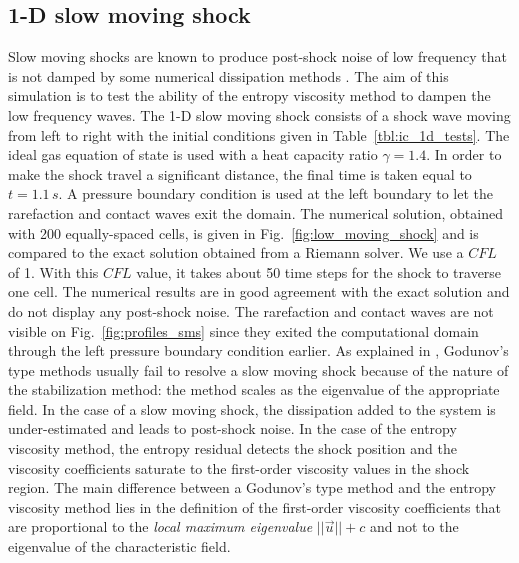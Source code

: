 \documentclass[review,10pt]{elsarticle}
\newcommand{\fig}[1]{Fig.~\ref{#1}}                      %
\newcommand{\tbl}[1]{Table~\ref{#1}}                     %
\begin{document}
\subsection{1-D slow moving shock} \label{sec:slow_moving_shock}

Slow moving shocks are known to produce post-shock noise of low frequency that is not damped by some 
numerical dissipation methods \cite{james}. The aim of this simulation is to test the ability of the 
entropy viscosity method to dampen the low frequency waves.
The 1-D slow moving shock consists of a shock wave moving from left to right with the initial conditions 
given in \tbl{tbl:ic_1d_tests}. The ideal gas equation of state is used with a heat capacity ratio 
$\gamma=1.4$.  In order to make the shock travel a significant distance, the final time is taken 
equal to $t=1.1\,s$. A pressure boundary condition is used at the left boundary to let the rarefaction 
and contact waves exit the domain.   
%
The numerical solution, obtained with 200 equally-spaced cells, is given in \fig{fig:low_moving_shock} 
and is compared to the exact solution obtained from a Riemann solver. We use a $CFL$ of 1. With this 
$CFL$ value, it takes about 50 time steps for the shock to traverse one cell.
%
The numerical results are in good agreement with the exact solution and do not display any post-shock 
noise. The rarefaction and contact waves are not visible on \fig{fig:profiles_sms} since they exited 
the computational domain through the left pressure boundary condition earlier. As explained in 
\cite{roberts}, Godunov's type methods usually fail to resolve a slow moving shock because of the 
nature of the stabilization method: the method scales as the eigenvalue of the appropriate field. 
In the case of a slow moving shock, the dissipation added to the system is under-estimated and leads 
to post-shock noise. In the case of the entropy viscosity method, the entropy residual detects 
the shock position and the viscosity coefficients saturate to the first-order viscosity values in 
the shock region. The main difference between a  Godunov's type method and the entropy viscosity 
method lies in the definition of the first-order viscosity coefficients that are proportional to 
the \emph{local maximum eigenvalue} $||\vec{u}||+c$ and not to the eigenvalue of the characteristic field.
%
\end{document}
